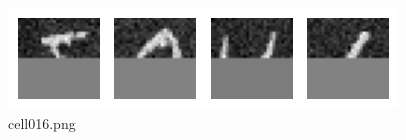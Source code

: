 \begin{figure}[ht]
	\centering
	\includegraphics[scale=0.8, max width=\linewidth]{./fig/energy-based-model/boltzmann-machine/cell016.png}
	\caption{cell016.png}
	\label{cell016.png}
\end{figure}